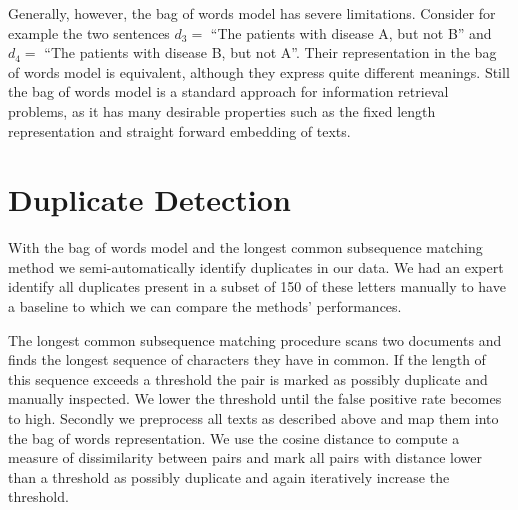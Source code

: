 Generally, however, the bag of words model has severe limitations. Consider for example
the two sentences $d_{3}=$ ``The patients with disease A, but not B'' and $d_{4}=$ ``The patients with disease B, but not A''. Their representation in the bag of words model is equivalent,
although they express quite different meanings. Still the bag of words
model is a standard approach for information retrieval problems, as
it has many desirable properties such as the fixed length representation and straight forward embedding of texts.



\section{Duplicate Detection}

With the bag of words model and the longest common subsequence matching method we semi-automatically identify duplicates in our data. We had an expert identify all duplicates present in a subset of 150 of these letters manually to have a baseline to which we can compare the methods' performances.

The longest common subsequence matching procedure scans two documents and finds the longest sequence of characters they have in common. If the length of this sequence exceeds a threshold the pair is marked as possibly duplicate and manually inspected. We lower the threshold until the false positive rate becomes to high. Secondly we preprocess all texts as described above and map them into the bag of words representation. We use the cosine distance to compute a measure of dissimilarity between pairs and mark all pairs with distance lower than a threshold as possibly duplicate and again iteratively increase the threshold.

